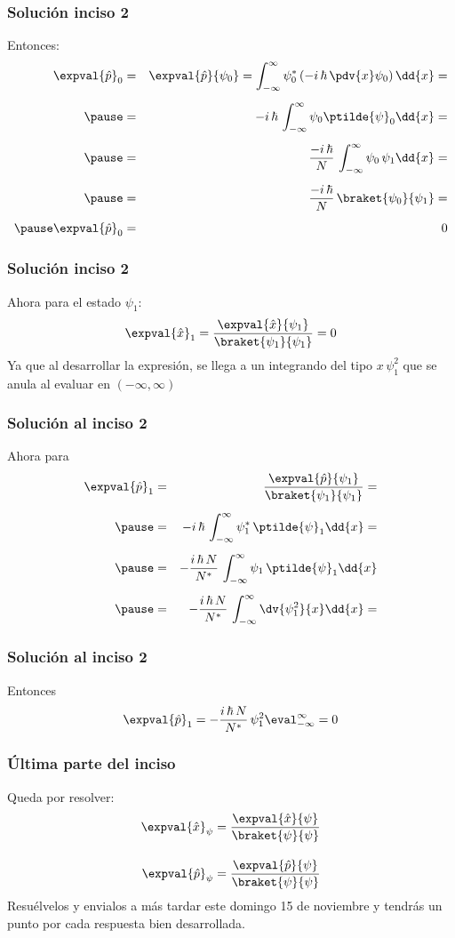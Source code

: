 \begin{frame}
\frametitle{Solución inciso 2}
\fontsize{12}{12}\selectfont
Entonces:
\begin{eqnarray*}
\expval{\hat{p}}_{0} &=& \expval{\hat{p}}{\psi_{0}} = \int_{-\infty}^{\infty} \psi_{0}^{*} \left( - i \, \hbar \, \pdv{x} \psi_{0} \right) \dd{x} = \\[0.5em] \pause
&=& -i \, \hbar \, \int_{-\infty}^{\infty} \psi_{0} \ptilde{\psi}_{0} \dd{x} = \\[0.5em] \pause
&=& \dfrac{-i \, \hbar}{N} \, \int_{-\infty}^{\infty} \psi_{0} \, \psi_{1} \dd{x} = \\[0.5em] \pause
&=& \dfrac{-i \, \hbar}{N} \, \braket{\psi_{0}}{\psi_{1}} = \\[0.5em] \pause
\expval{\hat{p}}_{0} &=& 0
\end{eqnarray*}
\end{frame}
\begin{frame}
\frametitle{Solución inciso 2}
Ahora para el estado $\psi_{1}$:
\\
\bigskip
\pause
\begin{align*}
\expval{\hat{x}}_{1} = \dfrac{\expval{\hat{x}}{\psi_{1}}}{\braket{\psi_{1}}{\psi_{1}}} = 0
\end{align*}
Ya que al desarrollar la expresión, se llega a un integrando del tipo $x \, \psi_{1}^{2}$ que se anula al evaluar en $(-\infty, \infty)$ 
\end{frame}
\begin{frame}
\frametitle{Solución al inciso 2}
Ahora para 
\begin{eqnarray*}
\expval{\hat{p}}_{1} &=& \dfrac{\expval{\hat{p}}{\psi_{1}}}{\braket{\psi_{1}}{\psi_{1}}} = \\[0.5em] \pause
&=& - i \, \hbar \, \int_{-\infty}^{\infty} \psi_{1}^{*} \, \ptilde{\psi}_{1} \dd{x} = \\[0.5em] \pause
&=& - \dfrac{i \, \hbar \, N}{N^{*}} \, \int_{-\infty}^{\infty} \psi_{1} \, \ptilde{\psi}_{1} \dd{x} \\[0.5em] \pause
&=& - \dfrac{i \, \hbar \, N}{N^{*}} \, \int_{-\infty}^{\infty} \dv{\psi_{1}^{2}}{x} \dd{x} = 
\end{eqnarray*}
\end{frame}
\begin{frame}
\frametitle{Solución al inciso 2}
Entonces
\begin{eqnarray*}
\expval{\hat{p}}_{1} = - \dfrac{i \, \hbar \, N}{N^{*}} \, \psi_{1}^{2} \eval_{-\infty}^{\infty} = 0
\end{eqnarray*}
\end{frame}
\begin{frame}
\frametitle{Última parte del inciso}
Queda por resolver:
\begin{align*}
\expval{\hat{x}}_{\psi} &= \dfrac{\expval{\hat{x}}{\psi}}{\braket{\psi}{\psi}} \\[1em]
\expval{\hat{p}}_{\psi} &= \dfrac{\expval{\hat{p}}{\psi}}{\braket{\psi}{\psi}}
\end{align*}
\pause
Resuélvelos y envialos a más tardar este domingo 15 de noviembre y tendrás un punto por cada respuesta bien desarrollada.

\end{frame}
